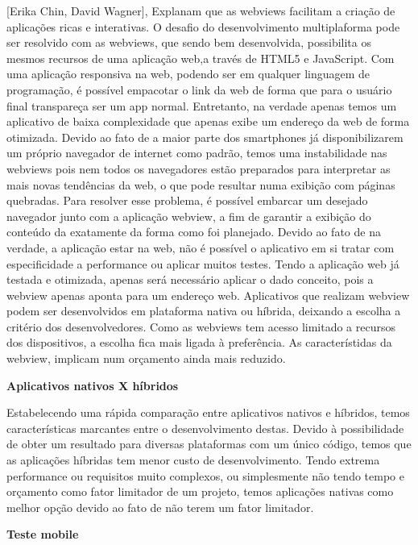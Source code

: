[Erika Chin, David Wagner], Explanam que as webviews facilitam a criação de aplicações ricas e interativas. O desafio do desenvolvimento multiplaforma pode ser resolvido com as webviews, que sendo bem desenvolvida, possibilita os mesmos recursos de uma aplicação web,a través de HTML5 e JavaScript. 
Com uma aplicação responsiva na web, podendo ser em qualquer linguagem de programação, é possível empacotar o link da web de forma que para o usuário final transpareça ser um app normal. Entretanto, na verdade apenas temos um aplicativo de baixa complexidade que apenas exibe um endereço da web de forma otimizada. Devido ao fato de a maior parte dos smartphones já disponibilizarem um próprio navegador de internet como padrão, temos uma instabilidade nas webviews pois nem todos os navegadores estão preparados para interpretar as mais novas tendências da web, o que pode resultar numa exibição com páginas quebradas. Para resolver esse problema, é possível embarcar um desejado navegador junto com a aplicação webview, a fim de garantir a exibição do conteúdo da exatamente da forma como foi planejado. Devido ao fato de na verdade, a aplicação estar na web, não é possível o aplicativo em si tratar com especificidade a performance ou aplicar muitos testes. Tendo a aplicação web já testada e otimizada, apenas será necessário aplicar o dado conceito, pois a webview apenas aponta para um endereço web. Aplicativos que realizam webview podem ser desenvolvidos em plataforma nativa ou híbrida, deixando a escolha  a critério dos desenvolvedores. Como as webviews tem acesso limitado a recursos dos dispositivos, a escolha fica mais ligada à preferência. As característidas da webview, implicam num orçamento ainda mais reduzido.

\textbf{Aplicativos nativos X híbridos}

Estabelecendo uma rápida comparação entre aplicativos nativos e híbridos, temos  características marcantes entre o desenvolvimento destas. Devido à possibilidade de obter um resultado para diversas plataformas com um único código, temos que as aplicações híbridas tem menor custo de desenvolvimento. Tendo extrema performance ou requisitos muito complexos, ou simplesmente não tendo tempo e orçamento como fator limitador de um projeto, temos aplicações nativas como melhor opção devido ao fato de não terem um fator limitador.

\textbf{Teste mobile}

